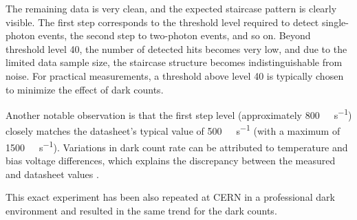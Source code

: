 The remaining data is very clean, and the expected staircase pattern is clearly visible. The first step corresponds to the threshold level required to detect single-photon events, the second step to two-photon events, and so on. Beyond threshold level 40, the number of detected hits becomes very low, and due to the limited data sample size, the staircase structure becomes indistinguishable from noise. For practical measurements, a threshold above level 40 is typically chosen to minimize the effect of dark counts.

Another notable observation is that the first step level (approximately \SI{800}{\kilo\count\per\second}) closely matches the datasheet’s typical value of \SI{500}{\kilo\count\per\second} (with a maximum of \SI{1500}{\kilo\count\per\second}). Variations in dark count rate can be attributed to temperature and bias voltage differences, which explains the discrepancy between the measured and datasheet values \cite{hamamatsuS13360}.

This exact experiment has been also repeated at CERN in a professional dark environment and resulted in the same trend for the dark counts.
